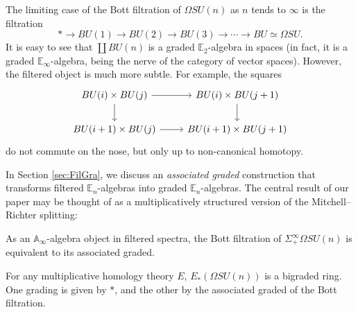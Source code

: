 \begin{exm}\label{exm:BottFil}
The limiting case of the Bott filtration of $\Omega SU(n)$ as $n$ tends to $\infty$ is the filtration
$$* \longrightarrow BU(1) \longrightarrow BU(2) \longrightarrow BU(3) \longrightarrow \cdots \longrightarrow BU \simeq \Omega SU.$$
It is easy to see that $\coprod BU(n)$ is a graded $\mathbb{E}_2$-algebra in spaces (in fact, it is a graded $\mathbb{E}_\infty$-algebra, being the nerve of the category of vector spaces).  However, the filtered object is much more subtle.  For example, the squares
$$
\begin{tikzcd}
BU(i) \times BU(j) \arrow{d} \arrow{r} & BU(i) \times BU(j+1) \arrow{d} \\
BU(i+1) \times BU(j) \arrow{r} & BU(i+1) \times BU(j+1)
\end{tikzcd}
$$
do not commute on the nose, but only up to non-canonical homotopy.
\end{exm}

In Section \ref{sec:FilGra}, we discuss an \textit{associated graded} construction that transforms filtered $\mathbb{E}_n$-algebras into graded $\mathbb{E}_n$-algebras.  The central result of our paper may be thought of as a multiplicatively structured version of the Mitchell--Richter splitting:

\begin{thm} \label{thm:MainAoo}
As an $\mathbb{A}_\infty$-algebra object in filtered spectra, the Bott filtration of $\Sigma^{\infty}_+ \Omega SU(n)$ is equivalent to its associated graded.
\end{thm}

\begin{cor}
For any multiplicative homology theory $E$, $E_*(\Omega SU(n))$ is a bigraded ring.  One grading is given by $*$, and the other by the associated graded of the Bott filtration.
\end{cor}

